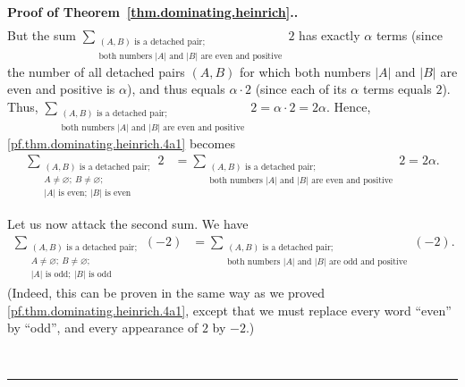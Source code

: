 \documentclass[numbers=enddot,12pt,final,onecolumn,notitlepage]{scrartcl}%
\theoremstyle{definition}
\newenvironment{proof}[1][Proof]{\noindent\textbf{#1.} }{\ \rule{0.5em}{0.5em}}
\let\sumnonlimits\sum
\renewcommand{\sum}{\sumnonlimits\limits}
\newcommand{\abs}[1]{\left| #1 \right|}
\newcommand{\tup}[1]{\left( #1 \right)}
\begin{document}
\begin{proof}[Proof of Theorem~\ref{thm.dominating.heinrich}.]
\begin{align}
\label{pf.thm.dominating.heinrich.4a1}
\end{align}
But the sum $\sum_{\substack{\tup{A, B} \text{ is a detached pair}; \\
                \text{both numbers } \abs{A} \text{ and } \abs{B}
                \text{ are even and positive}}} 2$
has exactly $\alpha$ terms (since the number of all detached pairs
$\tup{A, B}$ for which both numbers $\abs{A}$ and $\abs{B}$ are even
and positive is $\alpha$), and thus equals $\alpha \cdot 2$ (since
each of its $\alpha$ terms equals $2$). Thus,
$\sum_{\substack{\tup{A, B} \text{ is a detached pair}; \\
                \text{both numbers } \abs{A} \text{ and } \abs{B}
                \text{ are even and positive}}} 2
= \alpha \cdot 2 = 2 \alpha$. Hence,
\eqref{pf.thm.dominating.heinrich.4a1} becomes
\begin{align}
\sum_{\substack{\tup{A, B} \text{ is a detached pair}; \\
                A \neq \varnothing; \  B \neq \varnothing ; \\
                \abs{A} \text{ is even};
                \ \abs{B} \text{ is even}}}
   2
&= \sum_{\substack{\tup{A, B} \text{ is a detached pair}; \\
                \text{both numbers } \abs{A} \text{ and } \abs{B}
                \text{ are even and positive}}} 2
= 2 \alpha .
\label{pf.thm.dominating.heinrich.4a12}
\end{align}

Let us now attack the second sum. We have
\begin{align}
\sum_{\substack{\tup{A, B} \text{ is a detached pair}; \\
                A \neq \varnothing; \  B \neq \varnothing ; \\
                \abs{A} \text{ is odd};
                \ \abs{B} \text{ is odd}}}
   \tup{-2}
&= \sum_{\substack{\tup{A, B} \text{ is a detached pair}; \\
                \text{both numbers } \abs{A} \text{ and } \abs{B}
                \text{ are odd and positive}}} \tup{-2} .
\label{pf.thm.dominating.heinrich.4b1}
\end{align}
(Indeed, this can be proven in the same way as we proved
\eqref{pf.thm.dominating.heinrich.4a1}, except that we must replace
every word ``even'' by ``odd'', and every appearance of $2$ by $-2$.)


\end{proof}
\end{document}
